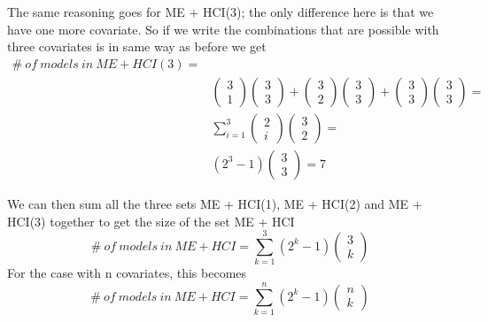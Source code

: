 The same reasoning goes for ME + HCI(3); the only difference here is that we have one more covariate. So if we write the combinations that are possible with three covariates is in same way as before we get
\begin{equation*}
\begin{aligned}
\#\ of\ models\ in\ ME+HCI(3)=\\
&\left( \begin{array}{c}
3 \\ 
1 \end{array}
\right)\left( \begin{array}{c}
3 \\ 
3 \end{array}
\right)+\left( \begin{array}{c}
3 \\ 
2 \end{array}
\right)\left( \begin{array}{c}
3 \\ 
3 \end{array}
\right)+\left( \begin{array}{c}
3 \\ 
3 \end{array}
\right)\left( \begin{array}{c}
3 \\ 
3 \end{array}
\right)= \\
&\sum^3_{i=1}{\left( \begin{array}{c}
2 \\ 
i \end{array}
\right)}\left( \begin{array}{c}
3 \\ 
2 \end{array}
\right)= \\
&\left(2^3-1\right)\left( \begin{array}{c}
3 \\ 
3 \end{array}
\right)=7
\end{aligned}
\end{equation*}


We can then sum all the three sets ME + HCI(1), ME + HCI(2) and ME + HCI(3) together to get the size of the set ME + HCI
\[\#\ of\ models\ in\ ME+HCI=\sum^3_{k=1}{(2^k-1)\left( \begin{array}{c}
3 \\ 
k \end{array}
\right)}\] 
For the case with n covariates, this becomes
\[\#\ of\ models\ in\ ME+HCI=\sum^n_{k=1}{(2^k-1)\left( \begin{array}{c}
n \\ 
k \end{array}
\right)}\] 

